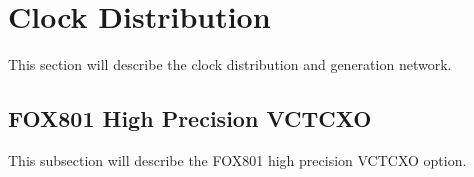 \section{Clock Distribution} %
    
    This section will describe the clock distribution and generation network.
    
    \subsection{FOX801 High Precision VCTCXO} %
        This subsection will describe the FOX801 high precision VCTCXO option.
